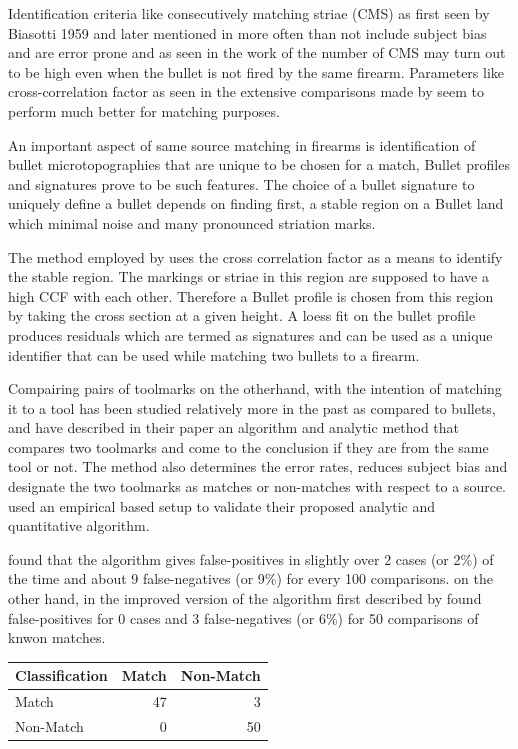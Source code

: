 \documentclass[12pt]{article}
\begin{document}
Identification criteria like consecutively matching striae (CMS) as
first seen by Biasotti 1959 \citet{biasotti} and later mentioned in
\citet{chu2013} more often than not include subject bias and are error
prone and as seen in the work of \citet{miller} the number of CMS may
turn out to be high even when the bullet is not fired by the same
firearm. Parameters like cross-correlation factor as seen in the
extensive comparisons made by \citep{aoas} seem to perform much better
for matching purposes.

An important aspect of same source matching in firearms is
identification of bullet microtopographies that are unique to be chosen
for a match, Bullet profiles and signatures prove to be such features.
The choice of a bullet signature to uniquely define a bullet depends on
finding first, a stable region on a Bullet land which minimal noise and
many pronounced striation marks. \citet{aoas}

The method employed by \citet{aoas} uses the cross correlation factor as
a means to identify the stable region. The markings or striae in this
region are supposed to have a high CCF with each other. Therefore a
Bullet profile is chosen from this region by taking the cross section at
a given height. A loess fit on the bullet profile produces residuals
which are termed as signatures and can be used as a unique identifier
that can be used while matching two bullets to a firearm.

Compairing pairs of toolmarks on the otherhand, with the intention of
matching it to a tool has been studied relatively more in the past as
compared to bullets, and \citet{chumbley} have described in their paper
an algorithm and analytic method that compares two toolmarks and come to
the conclusion if they are from the same tool or not. The method also
determines the error rates, reduces subject bias and designate the two
toolmarks as matches or non-matches with respect to a source.
\citet{chumbley} used an empirical based setup to validate their
proposed analytic and quantitative algorithm.

\citet{chumbley} found that the algorithm gives false-positives in
slightly over 2 cases (or 2\%) of the time and about 9 false-negatives
(or 9\%) for every 100 comparisons. \citet{hadler} on the other hand, in
the improved version of the algorithm first described by
\citet{chumbley} found false-positives for 0 cases and 3 false-negatives
(or 6\%) for 50 comparisons of knwon matches.

\begin{table}[!h]
\centering
\begin{tabular}{lrr}
\toprule
Classification & Match & Non-Match\\
\midrule
Match & 47 & 3\\
Non-Match & 0 & 50\\
\bottomrule
\end{tabular}
\end{table}
\end{document}

